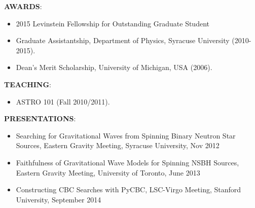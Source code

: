 {\bf AWARDS}:
\begin{itemize}
\item 2015 Levinstein Fellowship for Outstanding Graduate Student
\item Graduate Assistantship, Department of Physics, Syracuse University (2010-2015).
\item Dean's Merit Scholarship, University of Michigan, USA (2006).
\end{itemize}
{\bf TEACHING}:
\begin{itemize}
\item ASTRO 101 (Fall 2010/2011).
\end{itemize}
{\bf PRESENTATIONS}:
\begin{itemize}
\item Searching for Gravitational Waves from Spinning Binary Neutron Star Sources, Eastern Gravity Meeting, Syracuse University, Nov 2012
\item Faithfulness of Gravitational Wave Models for Spinning NSBH Sources, Eastern Gravity Meeting, University of Toronto, June 2013 \\
\item Constructing CBC Searches with PyCBC, LSC-Virgo Meeting, Stanford University, September 2014
\end{itemize}
